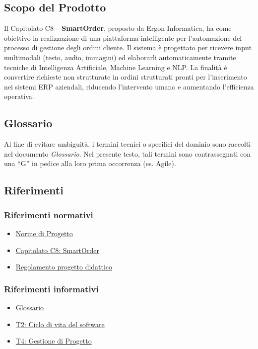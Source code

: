 \documentclass[a4paper, 11pt, oneside]{scrartcl} %
\begin{document}
\subsection{Scopo del Prodotto}
Il Capitolato{\scriptsize{}} C8 – \textbf{SmartOrder}, proposto da Ergon Informatica, ha come obiettivo la realizzazione di una piattaforma intelligente per l’automazione del processo di gestione degli ordini cliente.
Il sistema è progettato per ricevere input multimodali (testo, audio, immagini) ed elaborarli automaticamente tramite tecniche di Intelligenza Artificiale{\scriptsize{}}, Machine Learning{\scriptsize{}} e NLP{\scriptsize{}}.
La finalità è convertire richieste non strutturate in ordini strutturati pronti per l'inserimento nei sistemi ERP{\scriptsize{}} aziendali, riducendo l'intervento umano e aumentando l'efficienza operativa.

\subsection{Glossario}
Al fine di evitare ambiguità, i termini tecnici o specifici del dominio sono raccolti nel documento \textit{Glossario}. Nel presente testo, tali termini sono contrassegnati con una “G” in pedice alla loro prima occorrenza (es. Agile{\scriptsize{}}).

\subsection{Riferimenti}
\subsubsection{Riferimenti normativi}
\begin{itemize}
    \item \href{https://github.com/swenightpro/Documentazione/blob/main/docs/RTB/Documentazione%20Interna/}{Norme di Progetto}
    \item \href{https://www.math.unipd.it/~tullio/IS-1/2025/Progetto/C8.pdf}{Capitolato C8: SmartOrder}
    \item \href{https://www.math.unipd.it/~tullio/IS-1/2025/Dispense/PD1.pdf}{Regolamento progetto didattico}
\end{itemize}

\subsubsection{Riferimenti informativi}
\begin{itemize}
    \item \href{https://github.com/swenightpro/Documentazione/blob/main/docs/RTB/Documentazione%20Esterna}{Glossario}
    \item \href{https://www.math.unipd.it/~tullio/IS-1/2025/Dispense/T02.pdf}{T2: Ciclo di vita del software}
    \item \href{https://www.math.unipd.it/~tullio/IS-1/2025/Dispense/T04.pdf}{T4: Gestione di Progetto}
\end{itemize}
\end{document}
